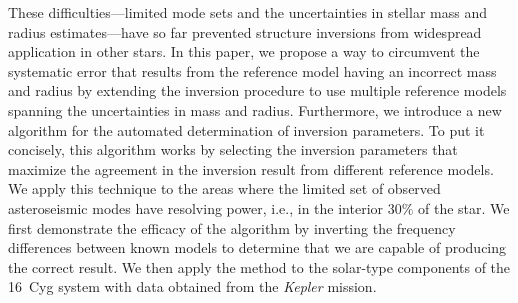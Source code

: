 \vspace{1cm}

These difficulties---limited mode sets and the uncertainties in stellar mass and radius estimates---have so far prevented structure inversions from widespread application in other stars. 
In this paper, we propose a way to circumvent the systematic error that results from the reference model having an incorrect mass and radius by extending the inversion procedure to use multiple reference models spanning the uncertainties in mass and radius. 
Furthermore, we introduce a new algorithm for the automated determination of inversion parameters. 
To put it concisely, this algorithm works by selecting the inversion parameters that maximize the agreement in the inversion result from different reference models. 
We apply this technique to the areas where the limited set of observed asteroseismic modes have resolving power, i.e., in the interior $30\%$ of the star. 
We first demonstrate the efficacy of the algorithm by inverting the frequency differences between known models to determine that we are capable of producing the correct result. 
We then apply the method to the solar-type components of the 16~Cyg system with data obtained from the \emph{Kepler} mission. 





{}
